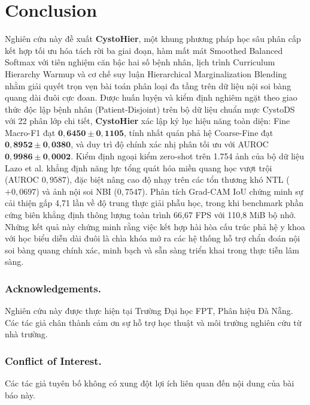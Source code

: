 \documentclass[runningheads]{llncs}
\begin{document}
\section{Conclusion}
\label{sec:conclusion}
Nghiên cứu này đề xuất \textbf{CystoHier}, một khung phương pháp học sâu phân cấp kết hợp tối ưu hóa tách rời ba giai đoạn, hàm mất mát Smoothed Balanced Softmax với tiên nghiệm căn bậc hai số bệnh nhân, lịch trình Curriculum Hierarchy Warmup và cơ chế suy luận Hierarchical Marginalization Blending nhằm giải quyết trọn vẹn bài toán phân loại đa tầng trên dữ liệu nội soi bàng quang dài đuôi cực đoan. Được huấn luyện và kiểm định nghiêm ngặt theo giao thức độc lập bệnh nhân (Patient-Disjoint) trên bộ dữ liệu chuẩn mực CystoDS với 22 phân lớp chi tiết, \textbf{CystoHier} xác lập kỷ lục hiệu năng toàn diện: Fine Macro-F1 đạt $\mathbf{0{,}6450 \pm 0{,}1105}$, tính nhất quán phả hệ Coarse-Fine đạt $\mathbf{0{,}8952 \pm 0{,}0380}$, và duy trì độ chính xác nhị phân tối ưu với AUROC $\mathbf{0{,}9986 \pm 0{,}0002}$. Kiểm định ngoại kiểm zero-shot trên 1.754 ảnh của bộ dữ liệu Lazo et al. khẳng định năng lực tổng quát hóa miền quang học vượt trội (AUROC $0{,}9587$), đặc biệt nâng cao độ nhạy trên các tổn thương khó NTL ($+0{,}0697$) và ảnh nội soi NBI ($0{,}7547$). Phân tích Grad-CAM IoU chứng minh sự cải thiện gấp 4,71 lần về độ trung thực giải phẫu học, trong khi benchmark phần cứng biên khẳng định thông lượng toàn trình 66,67 FPS với 110,8 MiB bộ nhớ. Những kết quả này chứng minh rằng việc kết hợp hài hòa cấu trúc phả hệ y khoa với học biểu diễn dài đuôi là chìa khóa mở ra các hệ thống hỗ trợ chẩn đoán nội soi bàng quang chính xác, minh bạch và sẵn sàng triển khai trong thực tiễn lâm sàng.

\subsubsection*{Acknowledgements.}
Nghiên cứu này được thực hiện tại Trường Đại học FPT, Phân hiệu Đà Nẵng. Các tác giả chân thành cảm ơn sự hỗ trợ học thuật và môi trường nghiên cứu từ nhà trường.

\subsubsection*{Conflict of Interest.}
Các tác giả tuyên bố không có xung đột lợi ích liên quan đến nội dung của bài báo này.
\end{document}
